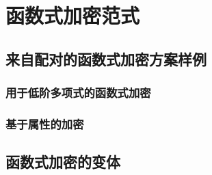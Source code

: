 \section{函数式加密范式}\label{sec:15-7}

\begin{definition}\label{def:15-12}
	
\end{definition}

\begin{example}\label{exmp:15-1}
	
\end{example}

\begin{example}\label{exmp:15-2}
	
\end{example}

\begin{game}[语义安全性]\label{game:15-8}
	
\end{game}

\begin{definition}[语义安全性]\label{def:15-13}
	
\end{definition}

\begin{remark}\label{remark:15-8}
	
\end{remark}

\begin{definition}[健壮的函数式加密]\label{def:15-14}
	
\end{definition}

\subsection{来自配对的函数式加密方案样例}\label{subsec:15-7-1}

\subsubsection{用于低阶多项式的函数式加密}\label{subsubsec:15-7-1-1}

\subsubsection{基于属性的加密}\label{subsubsec:15-7-1-2}

\subsection{函数式加密的变体}\label{subsec:15-7-2}
